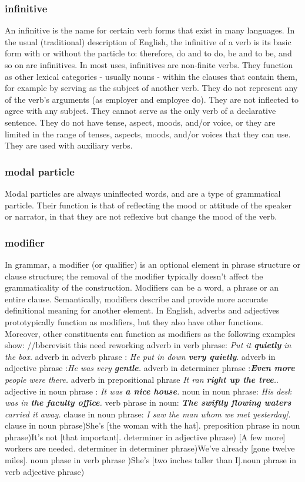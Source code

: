 \begin{small}
\subsubsection{infinitive}
An infinitive is the name for certain verb forms that exist in many languages. In the usual (traditional) description of English, the infinitive of a verb is its basic form with or without the particle to: therefore, do and to do, be and to be, and so on are infinitives.  In most uses, infinitives are non-finite verbs.  They function as other lexical categories - usually nouns - within the clauses that contain them, for example by serving as the subject of another verb.  They do not represent any of the verb's arguments (as employer and employee do).  They are not inflected to agree with any subject.  They cannot serve as the only verb of a declarative sentence.  They do not have tense, aspect, moods, and/or voice, or they are limited in the range of tenses, aspects, moods, and/or voices that they can use. They are used with auxiliary verbs.

\subsubsection{modal particle}Modal particles are always uninflected words, and are a type of grammatical particle. Their function is that of reflecting the mood or attitude of the speaker or narrator, in that they are not reflexive but change the mood of the verb.

\subsubsection{modifier}
In grammar, a modifier (or qualifier) is an optional element in phrase structure or clause structure; the removal of the modifier typically doesn't affect the grammaticality of the construction. Modifiers can be a word, a phrase or an entire clause. Semantically, modifiers describe and provide more accurate definitional meaning for another element.  In English, adverbs and adjectives prototypically function as modifiers, but they also have other functions. Moreover, other constituents can function as modifiers as the following examples show:
//bbcrevisit this need reworking
adverb in verb phrase: \emph{Put it \textbf{quietly} in the box.}
adverb in adverb phrase : \emph{He put in down \textbf{very quietly}}.
adverb in adjective phrase :\emph{He was very \textbf{gentle}.}
adverb in determiner phrase :\emph{\textbf{Even more} people were there.}
adverb in prepositional phrase \emph{It ran \textbf{right up the tree}.}.
adjective in noun phrase : \emph{It was \textbf{a nice house}.}
noun in noun phrase: \emph{His desk was in \textbf{the faculty office}.}
verb phrase in noun: \emph{\textbf{The swiftly flowing waters} carried it away.}
clause in noun phrase: \emph{I saw the man whom we met yesterday]}.
clause in noun phrase)She's [the woman with the hat].
preposition phrase in noun phrase)It's not [that important]. determiner in adjective phrase) [A few more] workers are needed.
 determiner in determiner phrase)We've already [gone twelve miles]. noun phase in verb phrase
)She's [two inches taller than I].noun phrase in verb adjective phrase)


\end{small}
